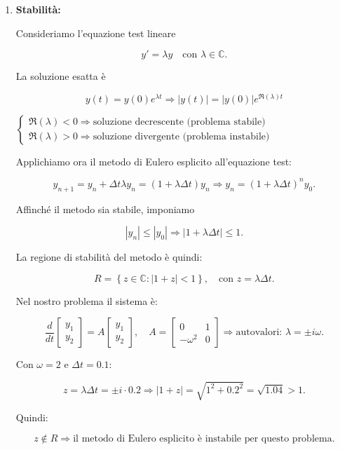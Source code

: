 \documentclass[12pt,a4paper]{article}
\begin{document}
\begin{enumerate}
\item \textbf{Stabilità:}

Consideriamo l’equazione test lineare

\[
y' = \lambda y \quad \text{con } \lambda \in \mathbb{C}.
\]

La soluzione esatta è

\[
y(t) = y(0) e^{\lambda t} \Rightarrow |y(t)| = |y(0)| e^{\Re(\lambda) t}
\]

$\begin{cases}
\Re(\lambda) < 0 \Rightarrow \text{soluzione decrescente (problema stabile)}
\\
\Re(\lambda) > 0 \Rightarrow \text{soluzione divergente (problema instabile)}\end{cases}$

Applichiamo ora il metodo di Eulero esplicito all’equazione test:

\[
y_{n+1} = y_n + \Delta t \lambda y_n = (1 + \lambda \Delta t) y_n
\Rightarrow
y_n = (1 + \lambda \Delta t)^n y_0.
\]

Affinché il metodo sia stabile, imponiamo

\[
|y_n| \leq |y_0| \Rightarrow |1 + \lambda \Delta t| \leq 1.
\]

La regione di stabilità del metodo è quindi:

\[
R = \left\{ z \in \mathbb{C} : |1 + z| < 1 \right\}, \quad \text{con } z = \lambda \Delta t.
\]

Nel nostro problema il sistema è:

\[
\frac{d}{dt} \begin{bmatrix} y_1 \\ y_2 \end{bmatrix}
= A \begin{bmatrix} y_1 \\ y_2 \end{bmatrix}, \quad
A = \begin{bmatrix} 0 & 1 \\ -\omega^2 & 0 \end{bmatrix}
\Rightarrow \text{autovalori: } \lambda = \pm i\omega.
\]

Con \( \omega = 2 \) e \( \Delta t = 0.1 \):

\[
z = \lambda \Delta t = \pm i \cdot 0.2 \Rightarrow |1 + z| = \sqrt{1^2 + 0.2^2} = \sqrt{1.04} > 1.
\]

Quindi:

\[
z \notin R \Rightarrow \text{il metodo di Eulero esplicito è instabile per questo problema.}
\]



\end{enumerate}
\end{document}
